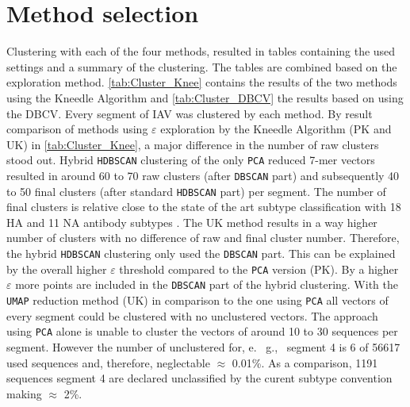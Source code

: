 \section{Method selection} \label{sec:Clustering}

Clustering with each of the four methods, resulted in tables containing the used settings and a summary of the clustering. The tables are combined based on the exploration method. \autoref{tab:Cluster_Knee} contains the results of the two methods using the Kneedle Algorithm and \autoref{tab:Cluster_DBCV} the results based on using the \gls{DBCV}. Every segment of \gls{IAV} was clustered by each method. By result comparison of methods using $\varepsilon$ exploration by the Kneedle Algorithm (PK and UK) in \autoref{tab:Cluster_Knee}, a major difference in the number of raw clusters stood out. Hybrid \texttt{HDBSCAN} clustering of the only \texttt{PCA} reduced 7-mer vectors resulted in around 60 to 70 raw clusters (after \texttt{DBSCAN} part) and subsequently 40 to 50 final clusters (after standard \texttt{HDBSCAN} part) per segment. The number of final clusters is relative close to the state of the art subtype classification with 18 \gls{HA} and 11 \gls{NA} antibody subtypes \autocite{noauthor_revision_1980}. The UK method results in a way higher number of clusters with no difference of raw and final cluster number. Therefore, the hybrid \texttt{HDBSCAN} clustering only used the \texttt{DBSCAN} part. This can be explained by the overall higher $\varepsilon$ threshold compared to the \texttt{PCA} version (PK). By a higher $\varepsilon$ more points are included in the \texttt{DBSCAN} part of the hybrid clustering. With the \texttt{UMAP} reduction method (UK) in comparison to the one using \texttt{PCA} all vectors of every segment could be clustered with no unclustered vectors. The approach using \texttt{PCA} alone is unable to cluster the vectors of around 10 to 30 sequences per segment. However the number of unclustered for, e.~ g.,~ segment 4 is 6 of 56617 used sequences and, therefore, neglectable $\approx$ 0.01\%. As a comparison, 1191 sequences segment 4 are declared unclassified by the curent subtype convention making $\approx$ 2\%. 

